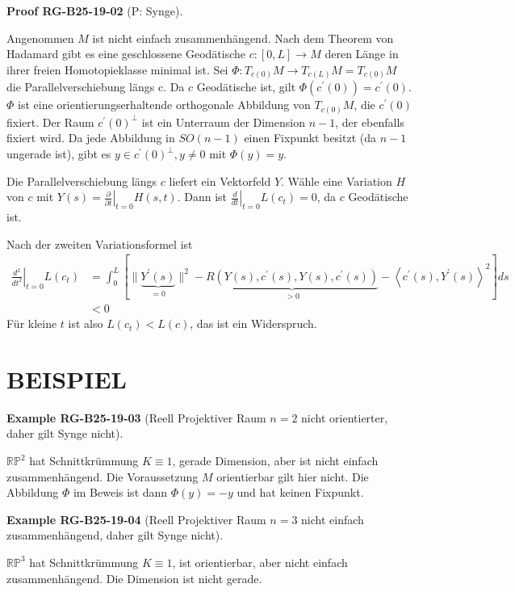 \documentclass[10pt, letterpaper]{article}
\newcommand{\CustomHeading}[3]{%
  \par\medskip\noindent%
  \textbf{#1 #2} \textnormal{(#3)}.\enskip%
}
\newenvironment{EXA}[2]{\begin{unitbox}\CustomHeading{Example}{#1}{#2}}{\end{unitbox}}
\newenvironment{PROOF}[2]{\begin{unitbox}\CustomHeading{Proof}{#1}{#2}}{\end{unitbox}}
\begin{document}
\begin{PROOF}{RG-B25-19-02}{P: Synge}
Angenommen $M$ ist nicht einfach zusammenhängend. Nach dem Theorem von Hadamard gibt es eine geschlossene Geodätische $c:[0, L] \rightarrow M$ deren Länge in ihrer freien Homotopieklasse minimal ist. Sei $\Phi: T_{c(0)} M \rightarrow T_{c(L)} M=T_{c(0)} M$ die Parallelverschiebung längs c. Da $c$ Geodätische ist, gilt $\Phi\left(c^{\prime}(0)\right)=c^{\prime}(0)$. $\Phi$ ist eine orientierungserhaltende orthogonale Abbildung von $T_{c(0)} M$, die $c^{\prime}(0)$ fixiert. Der Raum $c^{\prime}(0)^{\perp}$ ist ein Unterraum der Dimension $n-1$, der ebenfalls fixiert wird. Da jede Abbildung in $S O(n-1)$ einen Fixpunkt besitzt (da $n-1$ ungerade ist), gibt es $y \in c^{\prime}(0)^{\perp}, y \neq 0$ mit $\Phi(y)=y$.

Die Parallelverschiebung längs $c$ liefert ein Vektorfeld $Y$. Wähle eine Variation $H$ von $c$ mit $Y(s)=\left.\frac{\partial}{\partial t}\right|_{t=0} H(s, t)$. Dann ist $\left.\frac{d}{d t}\right|_{t=0} L\left(c_{t}\right)=0$, da $c$ Geodätische ist.

Nach der zweiten Variationsformel ist
$$
\begin{aligned}
\left.\frac{d^{2}}{d t^{2}}\right|_{t=0} L\left(c_{t}\right) & =\int_{0}^{L}[\|\underbrace{Y^{\prime}(s)}_{=0}\|^{2}-\underbrace{R\left(Y(s), c^{\prime}(s), Y(s), c^{\prime}(s)\right)}_{>0}-\left\langle c^{\prime}(s), Y^{\prime}(s)\right\rangle^{2}] d s \\
& <0
\end{aligned}
$$
Für kleine $t$ ist also $L\left(c_{t}\right)<L(c)$, das ist ein Widerspruch.
\end{PROOF}




\section*{BEISPIEL}

\begin{EXA}{RG-B25-19-03}{Reell Projektiver Raum $n=2$ nicht orientierter, daher gilt Synge nicht}
$\mathbb{R} \mathbb{P}^{2}$ hat Schnittkrümmung $K \equiv 1$, gerade Dimension, aber ist nicht einfach zusammenhängend. Die Voraussetzung $M$ orientierbar gilt hier nicht. Die Abbildung $\Phi$ im Beweis ist dann $\Phi(y)=-y$ und hat keinen Fixpunkt.
\end{EXA}


\begin{EXA}{RG-B25-19-04}{Reell Projektiver Raum $n=3$ nicht einfach zusammenhängend, daher gilt Synge nicht}
$\mathbb{R} \mathbb{P}^{3}$ hat Schnittkrümmung $K \equiv 1$, ist orientierbar, aber nicht einfach zusammenhängend. Die Dimension ist nicht gerade.
\end{EXA}
\end{document}
